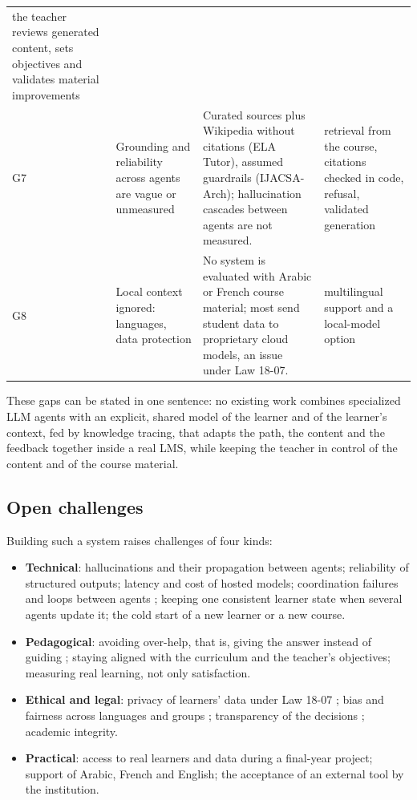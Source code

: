 \begin{table}[htbp]
\begin{tabularx}{\textwidth}{@{}L{0.7cm}L{3.3cm}YL{3.0cm}@{}}
  the teacher reviews generated content, sets objectives and validates material improvements \\
G7 & Grounding and reliability across agents are vague or unmeasured &
  Curated sources plus Wikipedia without citations (ELA Tutor), assumed guardrails (IJACSA-Arch); hallucination cascades between agents \cite{guo2024mas,cemri2025} are not measured. &
  retrieval from the course, citations checked in code, refusal, validated generation \\
G8 & Local context ignored: languages, data protection &
  No system is evaluated with Arabic or French course material; most send student data to proprietary cloud models, an issue under Law 18-07. &
  multilingual support and a local-model option \\
\bottomrule
\end{tabularx}
\end{table}

These gaps can be stated in one sentence: no existing work combines
specialized LLM agents with an explicit, shared model of the learner and
of the learner's context, fed by knowledge tracing, that adapts the path,
the content and the feedback together inside a real LMS, while keeping the
teacher in control of the content and of the course material.

\subsection{Open challenges}
\label{subsec-challenges}

Building such a system raises challenges of four kinds:

\begin{itemize}
  \item \textbf{Technical}: hallucinations and their propagation between
        agents; reliability of structured outputs; latency and cost of
        hosted models; coordination failures and loops between agents
        \cite{cemri2025}; keeping one consistent learner state when
        several agents update it; the cold start of a new learner or a new
        course.
  \item \textbf{Pedagogical}: avoiding over-help, that is, giving the
        answer instead of guiding \cite{bastani2025}; staying aligned with
        the curriculum and the teacher's objectives; measuring real
        learning, not only satisfaction.
  \item \textbf{Ethical and legal}: privacy of learners' data under Law
        18-07 \cite{algeria_law1807}; bias and fairness across languages
        and groups \cite{gallegos2024}; transparency of the decisions
        \cite{khosravi2022}; academic integrity.
  \item \textbf{Practical}: access to real learners and data during a
        final-year project; support of Arabic, French and English; the
        acceptance of an external tool by the institution.
\end{itemize}

